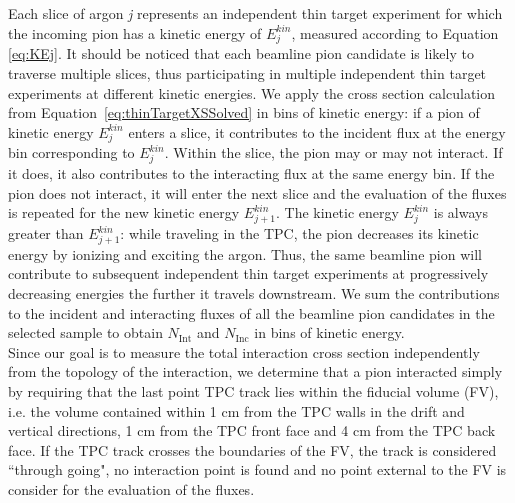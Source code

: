 \documentclass[aps,prl,twocolumn,showpacs,superscriptaddress,groupedaddress]{revtex4}  %
\begin{document}
Each slice of argon {\emph{j}} represents an independent thin target experiment for which the incoming pion has a kinetic energy of  $E^{kin}_j$, measured according to Equation \ref{eq:KEj}. It should be noticed that each beamline pion candidate is likely to traverse multiple slices, thus participating in multiple independent thin target experiments at different kinetic energies. 
We apply the cross section calculation from Equation~\ref{eq:thinTargetXSSolved} in bins of kinetic energy: if a pion of kinetic energy $E^{kin}_j$ enters a slice, it contributes to the incident flux at the energy bin corresponding to $E^{kin}_j$.  Within the slice, the pion may or may not interact. If it does, it also contributes to the interacting flux at the same energy bin. If the pion does not interact,  it will enter the next slice and the evaluation of the fluxes is repeated for the new kinetic energy $E^{kin}_{j+1}$.   The kinetic energy   $E^{kin}_j$ is always greater than $E^{kin}_{j+1}$: while traveling in the TPC, the pion decreases its kinetic energy by ionizing and exciting the  argon. Thus, the same beamline pion will contribute to subsequent independent thin target experiments at progressively decreasing energies the further it travels downstream. 
We sum the contributions to the incident and interacting fluxes of all the beamline pion candidates in the selected sample to obtain $N_{\text{Int}}$ and  $N_{\text{Inc}}$ in bins of kinetic energy.\\
Since our goal is to measure the total interaction cross section independently  from the topology of the interaction, we determine that a pion interacted simply by requiring that the last point TPC track lies within the fiducial volume (FV), i.e. the volume contained within 1 cm from the TPC walls in the drift and vertical directions, 1 cm from the TPC front face and 4 cm from the TPC back face.
If the TPC track crosses the boundaries of the FV, the track is considered ``through going", no interaction point is found and no point external to the FV is consider for the evaluation of the fluxes. 



 
\end{document}

